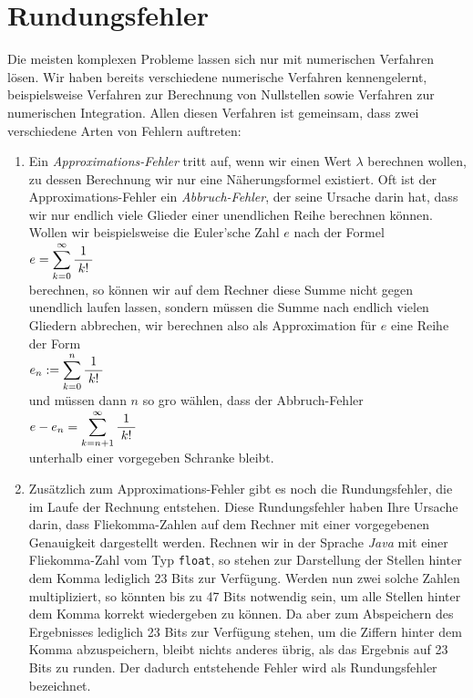 \chapter{Rundungsfehler}
Die meisten komplexen Probleme lassen sich nur mit numerischen Verfahren l\"osen.  Wir haben
bereits verschiedene numerische Verfahren kennengelernt, beispielsweise Verfahren zur
Berechnung von Nullstellen sowie Verfahren zur numerischen Integration.  Allen diesen
Verfahren ist gemeinsam, dass zwei verschiedene Arten von Fehlern auftreten:
\begin{enumerate}
\item Ein \emph{Approximations-Fehler} tritt auf, wenn wir einen Wert $\lambda$ berechnen
      wollen, zu dessen Berechnung wir nur eine N\"aherungsformel existiert.  Oft ist der
      Approximations-Fehler ein \emph{Abbruch-Fehler}, der seine
      Ursache darin hat, dass wir nur endlich viele Glieder einer unendlichen Reihe
      berechnen k\"onnen.  Wollen wir beispielsweise die Euler'sche Zahl $e$ nach der Formel
      \\[0.2cm]
      \hspace*{1.3cm}
      $\displaystyle e = \sum\limits_{k=0}^\infty \displaystyle\frac{\;\displaystyle1\;}{\;\displaystyle k!\;}$
      \\[0.2cm]
      berechnen, so k\"onnen wir auf dem Rechner diese Summe nicht gegen unendlich laufen
      lassen, sondern m\"ussen die Summe nach endlich vielen Gliedern abbrechen, wir berechnen
      also als Approximation f\"ur $e$ eine Reihe der Form
      \\[0.2cm]
      \hspace*{1.3cm}
      $\displaystyle e_n := \sum\limits_{k=0}^n \displaystyle\frac{\;\displaystyle1\;}{\;\displaystyle k!\;}$ 
      \\[0.2cm]
      und m\"ussen dann $n$ so gro\3 w\"ahlen, dass der Abbruch-Fehler
      \\[0.2cm]
      \hspace*{1.3cm}
      $\displaystyle e - e_n = \sum\limits_{k=n+1}^\infty \displaystyle\frac{\;\displaystyle1\;}{\;\displaystyle k!\;}$ 
      \\[0.2cm]
      unterhalb einer vorgegeben Schranke bleibt.
\item Zus\"atzlich zum Approximations-Fehler gibt es noch die Rundungsfehler, die im Laufe der Rechnung 
      entstehen.  Diese Rundungsfehler haben Ihre Ursache darin, dass Flie\3komma-Zahlen auf dem Rechner 
      mit einer vorgegebenen Genauigkeit dargestellt werden.  Rechnen wir in der Sprache \textsl{Java}
      mit einer Flie\3komma-Zahl vom Typ \texttt{float}, so stehen zur Darstellung der Stellen hinter dem
      Komma lediglich 23 Bits zur Verf\"ugung.  Werden nun zwei solche Zahlen multipliziert, so k\"onnten
      bis zu 47 Bits notwendig sein, um alle Stellen hinter dem Komma korrekt wiedergeben zu k\"onnen.
      Da aber zum Abspeichern des Ergebnisses lediglich 23 Bits zur Verf\"ugung stehen, um die Ziffern 
      hinter dem Komma abzuspeichern, bleibt nichts anderes \"ubrig, als das Ergebnis auf 23 Bits zu
      runden.  Der dadurch entstehende Fehler wird als Rundungsfehler bezeichnet.
\end{enumerate}
